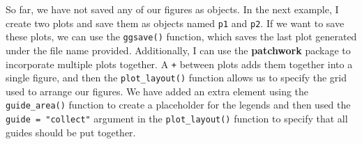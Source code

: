 \documentclass[
  letterpaper,
]{latex/krantz}
\begin{document}
So far, we have not saved any of our figures as objects. In the next
example, I create two plots and save them as objects named \texttt{p1}
and \texttt{p2}. If we want to save these plots, we can use the
\texttt{ggsave()}
function, which saves the last plot
generated under the file name provided. Additionally, I can use the
\textbf{patchwork} package  to incorporate
multiple plots together. A \texttt{+} between
plots adds them together into a single figure, and then the
\texttt{plot\_layout()}
function allows us to specify the grid used to arrange our figures. We
have added an extra element using the
\texttt{guide\_area()}
function to create a placeholder for the legends and then used the
\texttt{guide\ =\ "collect"} argument in the \texttt{plot\_layout()}
function to specify that all guides should be put together.
\end{document}
